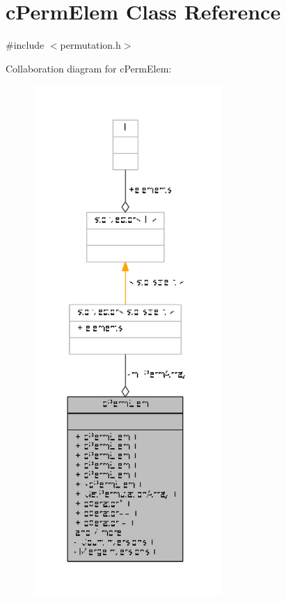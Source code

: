 \hypertarget{classcPermElem}{\section{c\-Perm\-Elem Class Reference}
\label{classcPermElem}
}


{\ttfamily \#include $<$permutation.\-h$>$}



Collaboration diagram for c\-Perm\-Elem\-:
\nopagebreak
\begin{figure}[H]
\begin{center}
\leavevmode
\includegraphics[height=550pt]{classcPermElem__coll__graph}
\end{center}
\end{figure}
